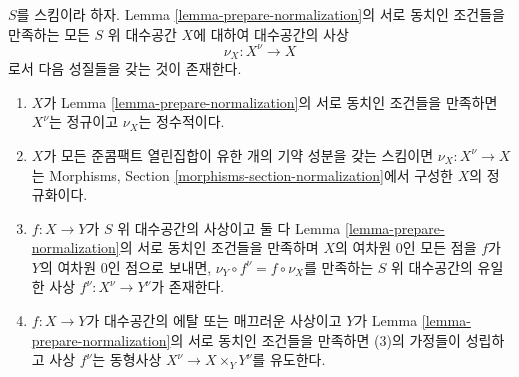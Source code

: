 \begin{lemma}
\label{lemma-normalization}
$S$를 스킴이라 하자. Lemma \ref{lemma-prepare-normalization}의 서로
동치인 조건들을 만족하는 모든 $S$ 위 대수공간 $X$에 대하여 대수공간의
사상
$$
\nu_X : X^\nu \longrightarrow X
$$
로서 다음 성질들을 갖는 것이 존재한다.
\begin{enumerate}
\item $X$가 Lemma \ref{lemma-prepare-normalization}의 서로 동치인 조건들을
만족하면 $X^\nu$는 정규이고 $\nu_X$는 정수적이다.
\item $X$가 모든 준콤팩트 열린집합이 유한 개의 기약 성분을 갖는
스킴이면 $\nu_X : X^\nu \to X$는 Morphisms, Section
\ref{morphisms-section-normalization}에서 구성한 $X$의 정규화이다.
\item $f : X \to Y$가 $S$ 위 대수공간의 사상이고 둘 다 Lemma
\ref{lemma-prepare-normalization}의 서로 동치인 조건들을 만족하며 $X$의
여차원 $0$인 모든 점을 $f$가 $Y$의 여차원 $0$인 점으로 보내면,
$\nu_Y \circ f^\nu = f \circ \nu_X$를 만족하는 $S$ 위 대수공간의 유일한
사상 $f^\nu : X^\nu \to Y^\nu$가 존재한다.
\item $f : X \to Y$가 대수공간의 에탈 또는 매끄러운 사상이고 $Y$가
Lemma \ref{lemma-prepare-normalization}의 서로 동치인 조건들을 만족하면
(3)의 가정들이 성립하고 사상 $f^\nu$는 동형사상
$X^\nu  \to X \times_Y Y^\nu$를 유도한다.
\end{enumerate}
\end{lemma}

